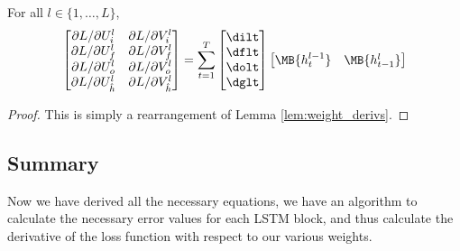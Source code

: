 \begin{corollary}
For all $l \in \{1,\dots,L\}$,
\begin{align}
\begin{bmatrix}
\partial L / \partial U_i^l & \partial L / \partial V_i^l \\
\partial L / \partial U_f^l & \partial L / \partial V_f^l \\
\partial L / \partial U_o^l & \partial L / \partial V_o^l \\
\partial L / \partial U_{\hat{h}}^l & \partial L / \partial V_{\hat{h}}^l
\end{bmatrix}
= \sum_{t=1}^T 
\begin{bmatrix}
\dilt \\
\dflt \\
\dolt \\
\dglt
\end{bmatrix}
\begin{bmatrix}
\MB{h_t^{l-1}} & \MB{h_{t-1}^l}
\end{bmatrix}
\end{align}
\end{corollary}
\begin{proof}
This is simply a rearrangement of Lemma \ref{lem:weight_derivs}.
\end{proof}




\subsection{Summary}
\label{subsec:summary}
Now we have derived all the necessary equations, we have an algorithm to calculate the necessary error values for each LSTM block, and thus calculate the derivative of the loss function with respect to our various weights.

